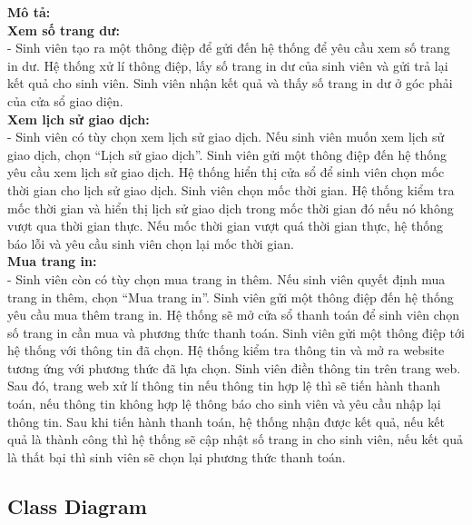 \documentclass[a4paper]{article}
\begin{document}
\noindent \textbf{Mô tả:}\\
\noindent \textbf{Xem số trang dư:}\\
\noindent - Sinh viên tạo ra một thông điệp để gửi đến hệ thống để yêu cầu xem số trang in dư. Hệ thống xử lí thông điệp, lấy số trang in dư của sinh viên và gửi trả lại kết quả cho sinh viên. Sinh viên nhận kết quả và thấy số trang in dư ở góc phải của cửa sổ giao diện.\\
\noindent \textbf{Xem lịch sử giao dịch:}\\
\noindent - Sinh viên có tùy chọn xem lịch sử giao dịch. Nếu sinh viên muốn xem lịch sử giao dịch, chọn “Lịch sử giao dịch”. Sinh viên gửi một thông điệp đến hệ thống yêu cầu xem lịch sử giao dịch. Hệ thống hiển thị cửa sổ để sinh viên chọn mốc thời gian cho lịch sử giao dịch. Sinh viên chọn mốc thời gian. Hệ thống kiểm tra mốc thời gian và hiển thị lịch sử giao dịch trong mốc thời gian đó nếu nó không vượt qua thời gian thực. Nếu mốc thời gian vượt quá thời gian thực, hệ thống báo lỗi và yêu cầu sinh viên chọn lại mốc thời gian.\\
\noindent \textbf{Mua trang in:}\\
\noindent - Sinh viên còn có tùy chọn mua trang in thêm. Nếu sinh viên quyết định mua trang in thêm, chọn “Mua trang in”. Sinh viên gửi một thông điệp đến hệ thống yêu cầu mua thêm trang in. Hệ thống sẽ mở cửa sổ thanh toán để sinh viên chọn số trang in cần mua và phương thức thanh toán. Sinh viên gửi một thông điệp tới hệ thống với thông tin đã chọn. Hệ thống kiểm tra thông tin và mở ra website tương ứng với phương thức đã lựa chọn. Sinh viên điền thông tin trên trang web. Sau đó, trang web xử lí thông tin nếu thông tin hợp lệ thì sẽ tiến hành thanh toán, nếu thông tin không hợp lệ thông báo cho sinh viên và yêu cầu nhập lại thông tin. Sau khi tiến hành thanh toán, hệ thống nhận được kết quả, nếu kết quả là thành công thì hệ thống sẽ cập nhật số trang in cho sinh viên, nếu kết quả là thất bại thì sinh viên sẽ chọn lại phương thức thanh toán.\\


\newpage
\subsection{Class Diagram}
\end{document}
